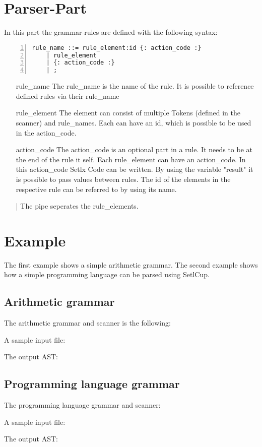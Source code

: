 \section{Parser-Part}
In this part the grammar-rules are defined with the following syntax:
\begin{lstlisting}[frame=single,numbers=left,basicstyle=\footnotesize]
rule_name ::= rule_element:id {: action_code :} 
	| rule_element
	| {: action_code :} 
	| ;
\end{lstlisting}
\begin{itemize}
	\item[rule\_name] The rule\_name is the name of the rule. It is possible to reference defined rules via their rule\_name
	\item[rule\_element] The element can consist of multiple Tokens (defined in the scanner) and rule\_names. Each can have an id, which is possible to be used in the action\_code.
	\item[action\_code] The action\_code is an optional part in a rule. It needs to be at the end of the rule it self. Each rule\_element can have an action\_code. In this action\_code Setlx Code can be written. By using the variable "result" it is possible to pass values between rules. The id of the elements in the respective rule can be referred to by using its name.
	\item[|] The pipe seperates the rule\_elements.
\end{itemize}
\newpage
\section{Example}
The first example shows a simple arithmetic grammar.
The second example shows how a simple programming language can be parsed using SetlCup.
\subsection{Arithmetic grammar}
The arithmetic grammar and scanner is the following:

A sample input file:

The output AST:

\subsection{Programming language grammar}
The programming language grammar and scanner:

A sample input file:

The output AST:

